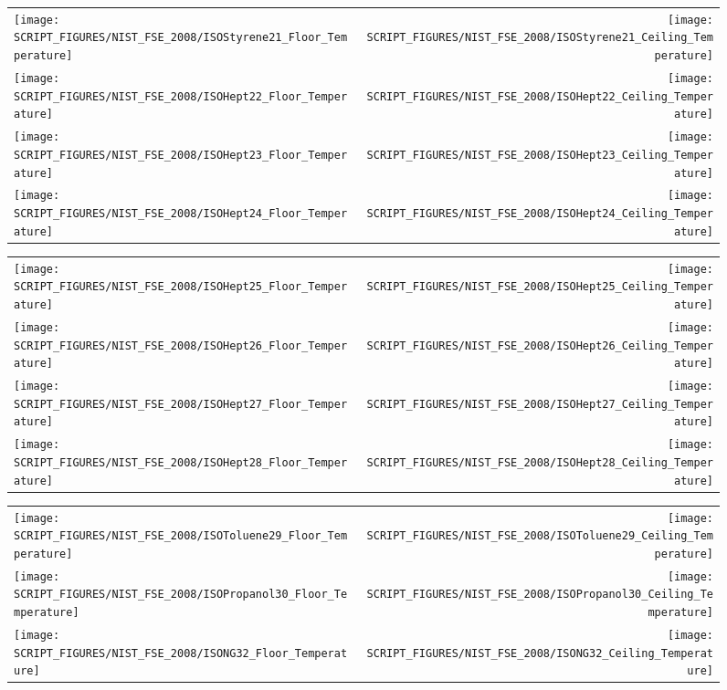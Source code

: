 \begin{figure}[p]
\begin{tabular*}{\textwidth}{l@{\extracolsep{\fill}}r}
\texttt{[image: SCRIPT\_FIGURES/NIST\_FSE\_2008/ISOStyrene21\_Floor\_Temperature]} &
\texttt{[image: SCRIPT\_FIGURES/NIST\_FSE\_2008/ISOStyrene21\_Ceiling\_Temperature]} \\
\texttt{[image: SCRIPT\_FIGURES/NIST\_FSE\_2008/ISOHept22\_Floor\_Temperature]} &
\texttt{[image: SCRIPT\_FIGURES/NIST\_FSE\_2008/ISOHept22\_Ceiling\_Temperature]} \\
\texttt{[image: SCRIPT\_FIGURES/NIST\_FSE\_2008/ISOHept23\_Floor\_Temperature]} &
\texttt{[image: SCRIPT\_FIGURES/NIST\_FSE\_2008/ISOHept23\_Ceiling\_Temperature]} \\
\texttt{[image: SCRIPT\_FIGURES/NIST\_FSE\_2008/ISOHept24\_Floor\_Temperature]} &
\texttt{[image: SCRIPT\_FIGURES/NIST\_FSE\_2008/ISOHept24\_Ceiling\_Temperature]}
\end{tabular*}
\label{NIST_FSE_2008_Surface_Temp_5}
\end{figure}

\begin{figure}[p]
\begin{tabular*}{\textwidth}{l@{\extracolsep{\fill}}r}
\texttt{[image: SCRIPT\_FIGURES/NIST\_FSE\_2008/ISOHept25\_Floor\_Temperature]} &
\texttt{[image: SCRIPT\_FIGURES/NIST\_FSE\_2008/ISOHept25\_Ceiling\_Temperature]} \\
\texttt{[image: SCRIPT\_FIGURES/NIST\_FSE\_2008/ISOHept26\_Floor\_Temperature]} &
\texttt{[image: SCRIPT\_FIGURES/NIST\_FSE\_2008/ISOHept26\_Ceiling\_Temperature]} \\
\texttt{[image: SCRIPT\_FIGURES/NIST\_FSE\_2008/ISOHept27\_Floor\_Temperature]} &
\texttt{[image: SCRIPT\_FIGURES/NIST\_FSE\_2008/ISOHept27\_Ceiling\_Temperature]} \\
\texttt{[image: SCRIPT\_FIGURES/NIST\_FSE\_2008/ISOHept28\_Floor\_Temperature]} &
\texttt{[image: SCRIPT\_FIGURES/NIST\_FSE\_2008/ISOHept28\_Ceiling\_Temperature]}
\end{tabular*}
\label{NIST_FSE_2008_Surface_Temp_6}
\end{figure}

\begin{figure}[p]
\begin{tabular*}{\textwidth}{l@{\extracolsep{\fill}}r}
\texttt{[image: SCRIPT\_FIGURES/NIST\_FSE\_2008/ISOToluene29\_Floor\_Temperature]} &
\texttt{[image: SCRIPT\_FIGURES/NIST\_FSE\_2008/ISOToluene29\_Ceiling\_Temperature]} \\
\texttt{[image: SCRIPT\_FIGURES/NIST\_FSE\_2008/ISOPropanol30\_Floor\_Temperature]} &
\texttt{[image: SCRIPT\_FIGURES/NIST\_FSE\_2008/ISOPropanol30\_Ceiling\_Temperature]} \\
\texttt{[image: SCRIPT\_FIGURES/NIST\_FSE\_2008/ISONG32\_Floor\_Temperature]} &
\texttt{[image: SCRIPT\_FIGURES/NIST\_FSE\_2008/ISONG32\_Ceiling\_Temperature]}
\end{tabular*}
\label{NIST_FSE_2008_Surface_Temp_7}
\end{figure}


